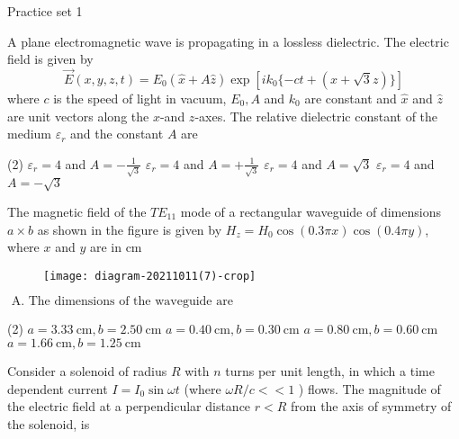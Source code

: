 \newpage
\begin{abox}
	Practice set 1
	\end{abox}
\begin{enumerate}
\begin{minipage}{\textwidth}
	\item A plane electromagnetic wave is propagating in a lossless dielectric. The electric field is given by
	$$
	\vec{E}(x, y, z, t)=E_{0}(\hat{x}+A \hat{z}) \exp \left[i k_{0}\{-c t+(x+\sqrt{3} z)\}\right]
	$$
	where $c$ is the speed of light in vacuum, $E_{0}, A$ and $k_{0}$ are constant and $\hat{x}$ and $\hat{z}$ are unit vectors along the $x$-and $z$-axes. The relative dielectric constant of the medium $\varepsilon_{r}$ and the constant $A$ are
\end{minipage}
\begin{tasks}(2)
	\task[\textbf{A.}]$\varepsilon_{r}=4$ and $A=-\frac{1}{\sqrt{3}}$
	\task[\textbf{B.}]$\varepsilon_{r}=4$ and $A=+\frac{1}{\sqrt{3}}$
	\task[\textbf{C.}]$\varepsilon_{r}=4$ and $A=\sqrt{3}$
	\task[\textbf{D.}]$\varepsilon_{r}=4$ and $A=-\sqrt{3}$
\end{tasks}
\begin{minipage}{\textwidth}
	\item The magnetic field of the $T E_{11}$ mode of a rectangular waveguide of dimensions $a \times b$ as shown in the figure is given by $H_{z}=H_{0} \cos (0.3 \pi x) \cos (0.4 \pi y)$, where $x$ and $y$ are in cm
	\begin{figure}[H]
		\centering
		\texttt{[image: diagram-20211011(7)-crop]}
		\caption{}
		\label{}
	\end{figure}
\end{minipage}
$\text { A. The dimensions of the waveguide are }$
\begin{tasks}(2)
	\task[\textbf{A.}] $a=3.33 \mathrm{~cm}, b=2.50 \mathrm{~cm}$
	\task[\textbf{B.}]$a=0.40 \mathrm{~cm}, b=0.30 \mathrm{~cm}$
	\task[\textbf{C.}]$a=0.80 \mathrm{~cm}, b=0.60 \mathrm{~cm}$
	\task[\textbf{D.}] $a=1.66 \mathrm{~cm}, b=1.25 \mathrm{~cm}$
\end{tasks}
\begin{minipage}{\textwidth}
	\item Consider a solenoid of radius $R$ with $n$ turns per unit length, in which a time dependent current $I=I_{0} \sin \omega t$ (where $\omega R / c<<1$ ) flows. The magnitude of the electric field at a perpendicular distance $r<R$ from the axis of symmetry of the solenoid, is

\end{minipage}
\end{enumerate}
